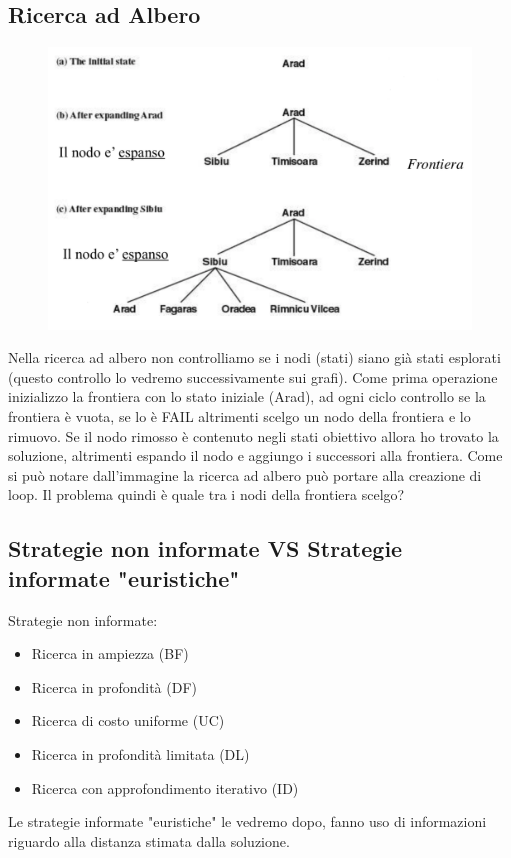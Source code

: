 \documentclass{article}
\begin{document}
\subsection{Ricerca ad Albero}
\begin{figure}[H]
    \centering
    \includegraphics[scale=0.4]{Images/alberocitta.png}
\end{figure}
Nella ricerca ad albero non controlliamo se i nodi (stati) siano già stati esplorati (questo controllo lo vedremo successivamente sui grafi). Come prima operazione inizializzo la frontiera con lo stato iniziale (Arad), ad ogni ciclo controllo se la frontiera è vuota, se lo è FAIL altrimenti scelgo un nodo della frontiera e lo rimuovo. Se il nodo rimosso è contenuto negli stati obiettivo allora ho trovato la soluzione, altrimenti espando il nodo e aggiungo i successori alla frontiera. Come si può notare dall'immagine la ricerca ad albero può portare alla creazione di loop. \newline
Il problema quindi è quale tra i nodi della frontiera scelgo?

\subsection{Strategie non informate VS Strategie informate "euristiche"}
Strategie non informate:
\begin{itemize}
    \item Ricerca in ampiezza (BF)
    \item Ricerca in profondità (DF)
    \item Ricerca di costo uniforme (UC)
    \item Ricerca in profondità limitata (DL)
    \item Ricerca con approfondimento iterativo (ID)
\end{itemize}
Le strategie informate "euristiche" le vedremo dopo, fanno uso di informazioni riguardo alla distanza stimata dalla soluzione.
\end{document}
